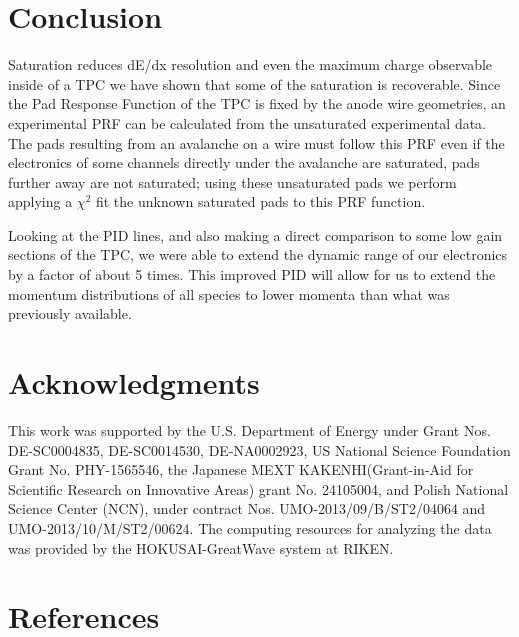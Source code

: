 \documentclass[review]{elsarticle}
\begin{document}


\section{Conclusion}

Saturation reduces dE/dx resolution and even the maximum charge observable inside of a TPC we have shown that some of the saturation is recoverable. Since the Pad Response Function of the TPC is fixed by the anode wire geometries, an experimental PRF can be calculated from the unsaturated experimental data. The pads resulting from an avalanche on a wire must follow this PRF even if the electronics of some channels directly under the avalanche are saturated, pads further away are not saturated; using these unsaturated pads we perform applying a $\chi^2$  fit the unknown saturated pads to this PRF function. 

Looking at the PID lines, and also making a direct comparison to some low gain sections of the TPC, we were able to extend the dynamic range of our electronics by a factor of about 5 times. This improved PID will allow for us to extend the momentum distributions of all species to lower momenta than what was previously available. 

\section{Acknowledgments}
This work was supported by the U.S. Department of Energy under Grant Nos.  DE-SC0004835,  DE-SC0014530, DE-NA0002923,  US  National Science Foundation Grant  No.  PHY-1565546, the  Japanese  MEXT  KAKENHI(Grant-in-Aid  for  Scientific  Research  on  Innovative  Areas)  grant  No. 24105004, and Polish National Science Center (NCN), under contract Nos. UMO-2013/09/B/ST2/04064 and UMO-2013/10/M/ST2/00624. The computing resources for analyzing the data was provided by the HOKUSAI-GreatWave system at RIKEN. 

\section*{References}


\end{document}
